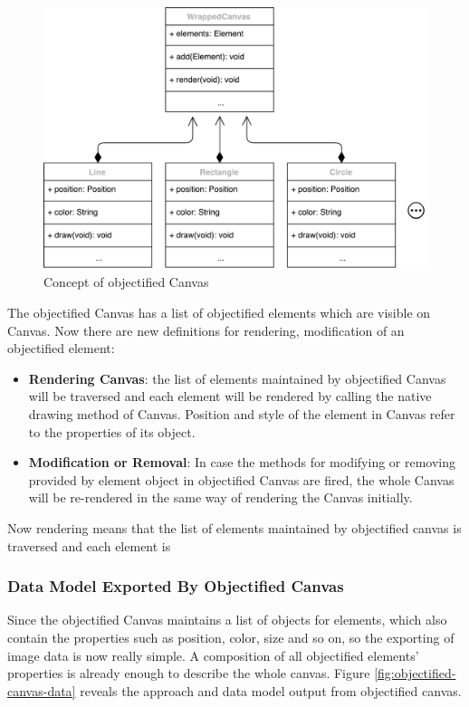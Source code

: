\begin{figure}[!htbp]
  \centering
    \includegraphics[width=1\textwidth]{Figures/concept-wrapped-canvas.pdf}
  \caption{Concept of objectified Canvas}
  \label{fig:objectified-canvas}
\end{figure}
The objectified Canvas has a list of objectified elements which are visible on Canvas. Now there are new definitions for rendering, modification of an objectified element:
\begin{itemize}
\item
\textbf{Rendering Canvas}: the list of elements maintained by objectified Canvas will be traversed and each element will be rendered by calling the native drawing method of Canvas. Position and style of the element in Canvas refer to the properties of its object.  
\item
\textbf{Modification or Removal}: In case the methods for modifying or removing provided by element object in objectified Canvas are fired, the whole Canvas will be re-rendered in the same way of rendering the Canvas initially.

\end{itemize}
Now rendering means that the list of elements maintained by objectified canvas is traversed and each element is 

\subsubsection{Data Model Exported By Objectified Canvas}
Since the objectified Canvas maintains a list of objects for elements, which also contain the properties such as position, color, size and so on, so the exporting of image data is now really simple. A composition of all objectified elements' properties is already enough to describe the whole canvas. Figure \ref{fig:objectified-canvas-data} reveals the approach and data model output from objectified canvas.

